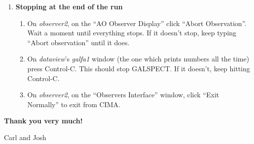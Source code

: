\begin{enumerate}
\begin{enumerate}
\begin{enumerate}
\item With the cursor on this plot window, type ``L'' in UPPERCASE.


\item At this point you should see seven plots, one for each of ALFA's
beams.  Each plot has two graphs, one yellow and one green.  They should
look similar, like a flat-topped {\it lemon-lime birthday cake} viewed
from the side (yum-yum!).  In the very center should be a narrow 21-cm
line with height about the same as that of the cake; regard the line as
a birthday candle in the very center of the cake.  (During the
calibration the candle moves around and sometimes disappears.)

	If you don't like the birthday cake, or if you are getting
bored, you can change the display by typing various combinations of
``a'', ``h'', and ``L''. {\it But whatever you do, DON'T TYPE w OR x}
because this will make big changes in the GALSPECT configuration.

	These plots should continually update once per second. If this
doesn't happen, then call Josh Goldston at 510 299 4427. 

\item The G-ALFA notebook in the control room has more details on GALSPECT
operation. 

\end{enumerate}
\end{enumerate}


---------------------------------  much time passes observing  ----------------------------------

\item {\bf Stopping at the end of the run} \begin{enumerate}

\item On {\it observer2}, on the ``AO Observer Display'' click ``Abort
Observation''. Wait a moment until everything stops. If it doesn't stop,
keep typing ``Abort observation'' until it does.

\item On {\it dataview}'s {\it galfa1} window (the
one which prints numbers all the time) press Control-C. This should stop
GALSPECT. If it doesn't, keep hitting Control-C.

\item On {\it observer2}, on the ``Observers Interface'' window, click ``Exit
Normally'' to exit from CIMA. 

\end{enumerate}


\end{enumerate}

{\bf Thank you very much!}

Carl and Josh







